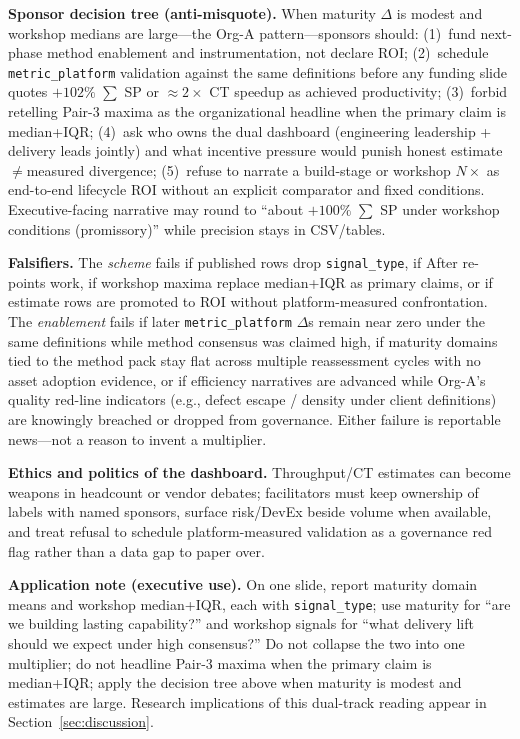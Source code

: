 \documentclass[10pt,conference]{IEEEtran}
\begin{document}
\textbf{Sponsor decision tree (anti-misquote).}
When maturity $\Delta$ is modest and workshop medians are large---the Org-A pattern---sponsors should: (1)~fund next-phase method enablement and instrumentation, not declare ROI; (2)~schedule \texttt{metric\_platform} validation against the same definitions before any funding slide quotes $+102\%$ $\sum$ SP or $\approx 2\times$ CT speedup as achieved productivity; (3)~forbid retelling Pair-3 maxima as the organizational headline when the primary claim is median+IQR; (4)~ask who owns the dual dashboard (engineering leadership + delivery leads jointly) and what incentive pressure would punish honest estimate$\neq$measured divergence; (5)~refuse to narrate a build-stage or workshop $N\times$ as end-to-end lifecycle ROI without an explicit comparator and fixed conditions.
Executive-facing narrative may round to ``about $+100\%$ $\sum$ SP under workshop conditions (promissory)'' while precision stays in CSV/tables.

\textbf{Falsifiers.}
The \emph{scheme} fails if published rows drop \texttt{signal\_type}, if After re-points work, if workshop maxima replace median+IQR as primary claims, or if estimate rows are promoted to ROI without platform-measured confrontation.
The \emph{enablement} fails if later \texttt{metric\_platform} $\Delta$s remain near zero under the same definitions while method consensus was claimed high, if maturity domains tied to the method pack stay flat across multiple reassessment cycles with no asset adoption evidence, or if efficiency narratives are advanced while Org-A's quality red-line indicators (e.g., defect escape / density under client definitions) are knowingly breached or dropped from governance.
Either failure is reportable news---not a reason to invent a multiplier.

\textbf{Ethics and politics of the dashboard.}
Throughput/CT estimates can become weapons in headcount or vendor debates; facilitators must keep ownership of labels with named sponsors, surface risk/DevEx beside volume when available, and treat refusal to schedule platform-measured validation as a governance red flag rather than a data gap to paper over.

\textbf{Application note (executive use).}
On one slide, report maturity domain means and workshop median+IQR, each with \texttt{signal\_type}; use maturity for ``are we building lasting capability?'' and workshop signals for ``what delivery lift should we expect under high consensus?''
Do not collapse the two into one multiplier; do not headline Pair-3 maxima when the primary claim is median+IQR; apply the decision tree above when maturity is modest and estimates are large.
Research implications of this dual-track reading appear in Section~\ref{sec:discussion}.
\end{document}
